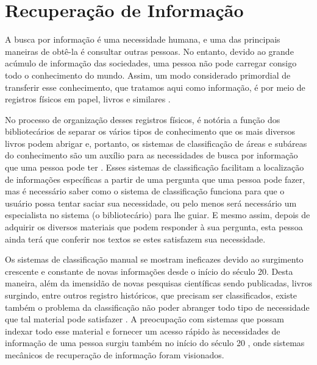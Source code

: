 \section{Recuperação de Informação} \label{sec:RecuperaçãoInformação}



    A busca por informação é uma necessidade humana, e uma das principais maneiras de obtê-la é consultar outras pessoas.
    No entanto, devido ao grande acúmulo de informação das sociedades, uma pessoa não pode carregar consigo todo o conhecimento do mundo.
    Assim, um modo considerado primordial de transferir esse conhecimento, que tratamos aqui como informação, é por meio de registros físicos em papel, livros e similares \cite[p.~1]{Grossman2004IRAH}.
    
    No processo de organização desses registros físicos, é notória a função dos bibliotecários de separar os vários tipos de conhecimento que os mais diversos livros podem abrigar e, portanto, os sistemas de classificação de áreas e subáreas do conhecimento são um auxílio para as necessidades de busca por informação que uma pessoa pode ter \cite[p.~1]{Manning2008IIR} \cite[p.~1446]{Sanderson2012THIRR} \cite[p.~6]{Baeza-Yates1999}. 
    Esses sistemas de classificação facilitam a localização de informações específicas a partir de uma pergunta que uma pessoa pode fazer, mas é necessário saber como o sistema de classificação funciona para que o usuário possa tentar saciar sua necessidade, ou pelo menos será necessário um especialista no sistema (o bibliotecário) para lhe guiar.
    E mesmo assim, depois de adquirir os diversos materiais que podem responder à sua pergunta, esta pessoa ainda terá que conferir nos textos se estes satisfazem sua necessidade.
    
    
    Os sistemas de classificação manual se mostram ineficazes devido ao surgimento crescente e constante de novas informações \cite[p.~6]{Baeza-Yates1999} desde o início do século 20. 
    Desta maneira, além da imensidão de novas pesquisas científicas sendo publicadas, livros surgindo, entre outros registro históricos, que precisam ser classificados, existe também o problema da classificação não poder abranger todo tipo de necessidade que tal material pode satisfazer \cite[p.~1444]{Sanderson2012THIRR}. 
    A preocupação com sistemas que possam indexar todo esse material e fornecer um acesso rápido às necessidades de informação de uma pessoa surgiu também no início do século 20 \cite{Bush:1979:WMT:1113634.1113638}, onde sistemas mecânicos de recuperação de informação foram visionados.
    
